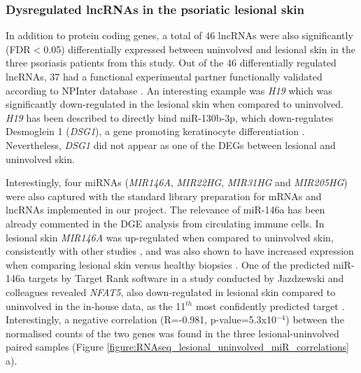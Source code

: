 
\subsubsection{Dysregulated lncRNAs in the psoriatic lesional skin}

In addition to protein coding genes, a total of 46 lncRNAs were also significantly (FDR$<$0.05) differentially expressed between uninvolved and lesional skin in the three psoriasis patients from this study. Out of the 46 differentially regulated lncRNAs, 37 had a functional experimental partner functionally validated according to NPInter database \parencite{Hao2016}. An interesting  example was \textit{H19} which was significantly down-regulated in the lesional skin when compared to uninvolved. \textit{H19} has been described to directly bind miR-130b-3p, which down-regulates Desmoglein 1 (\textit{DSG1}), a gene promoting keratinocyte differentiation \parencite{Li2017}. Nevertheless, \textit{DSG1} did not appear as one of the DEGs between lesional and uninvolved skin. %

Interestingly, four miRNAs (\textit{MIR146A}, \textit{MIR22HG}, \textit{MIR31HG} and \textit{MIR205HG}) were also captured with the standard library preparation for mRNAs and lncRNAs implemented in our project. The relevance of miR-146a has been already commented in the DGE analysis from circulating immune cells. In lesional skin \textit{MIR146A} was up-regulated when compared to uninvolved skin, consistently with other studies \parencite{Lerman2014, Tsoi2015}, and was also shown to have increased expression when comparing lesional skin versus healthy biopsies \parencite{Li2014}. One of the predicted miR-146a targets by Target Rank software in a study conducted by Jazdzewski and colleagues revealed \textit{NFAT5}, also down-regulated in lesional skin compared to uninvolved in the in-house data, as the 11$^{th}$ most confidently predicted target \parencite{Jazdzewski2009}. Interestingly, a negative correlation (R=-0.981, p-value=5.3x10$^{-4}$) between the normalised counts of the two genes was found in the three lesional-uninvolved paired samples (Figure \ref{figure:RNAseq_lesional_uninvolved_miR_correlations} a).


